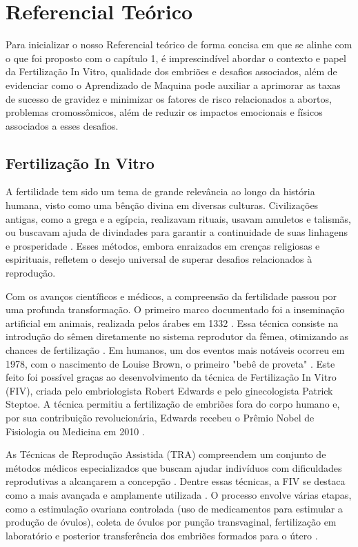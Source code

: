 \chapter[Referencial Teórico]{Referencial Teórico}

Para inicializar o nosso Referencial teórico de forma concisa em que se alinhe com o que foi proposto com o capítulo 1, é imprescindível abordar o contexto e papel da Fertilização In Vitro, qualidade dos embriões e desafios associados, além de evidenciar como o Aprendizado de Maquina pode auxiliar a aprimorar as taxas de sucesso de gravidez e minimizar os fatores de risco relacionados a abortos, problemas cromossômicos, além de reduzir os impactos emocionais e físicos associados a esses desafios.

\section{Fertilização In Vitro}

A fertilidade tem sido um tema de grande relevância ao longo da história humana, visto como uma bênção divina em diversas culturas. Civilizações antigas, como a grega e a egípcia, realizavam rituais, usavam amuletos e talismãs, ou buscavam ajuda de divindades para garantir a continuidade de suas linhagens e prosperidade \cite{moura2020}. Esses métodos, embora enraizados em crenças religiosas e espirituais, refletem o desejo universal de superar desafios relacionados à reprodução.

Com os avanços científicos e médicos, a compreensão da fertilidade passou por uma profunda transformação. O primeiro marco documentado foi a inseminação artificial em animais, realizada pelos árabes em 1332 \cite{moura2020}. Essa técnica consiste na introdução do sêmen diretamente no sistema reprodutor da fêmea, otimizando as chances de fertilização \cite{corleta2010}. Em humanos, um dos eventos mais notáveis ocorreu em 1978, com o nascimento de Louise Brown, o primeiro "bebê de proveta" \cite{moura2020}. Este feito foi possível graças ao desenvolvimento da técnica de Fertilização In Vitro (FIV), criada pelo embriologista Robert Edwards e pelo ginecologista Patrick Steptoe. A técnica permitiu a fertilização de embriões fora do corpo humano e, por sua contribuição revolucionária, Edwards recebeu o Prêmio Nobel de Fisiologia ou Medicina em 2010 \cite{corleta2010}.

As Técnicas de Reprodução Assistida (TRA) compreendem um conjunto de métodos médicos especializados que buscam ajudar indivíduos com dificuldades reprodutivas a alcançarem a concepção \cite{souzamarise2024}. Dentre essas técnicas, a FIV se destaca como a mais avançada e amplamente utilizada \cite{moura2020}. O processo envolve várias etapas, como a estimulação ovariana controlada (uso de medicamentos para estimular a produção de óvulos), coleta de óvulos por punção transvaginal, fertilização em laboratório e posterior transferência dos embriões formados para o útero \cite{moura2020}.

